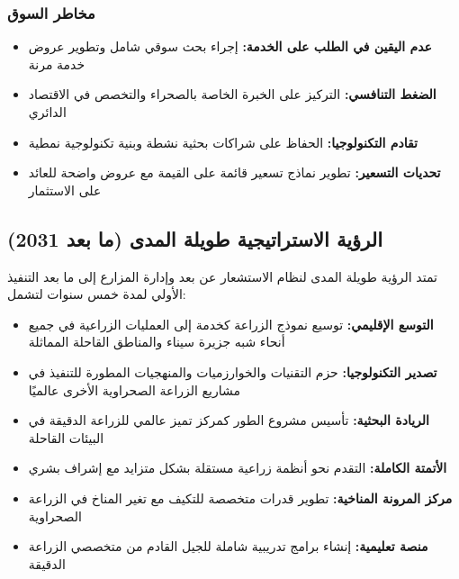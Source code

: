 \subsubsection{مخاطر السوق}
\begin{itemize}
    \item \textbf{عدم اليقين في الطلب على الخدمة:} إجراء بحث سوقي شامل وتطوير عروض خدمة مرنة
    \item \textbf{الضغط التنافسي:} التركيز على الخبرة الخاصة بالصحراء والتخصص في الاقتصاد الدائري
    \item \textbf{تقادم التكنولوجيا:} الحفاظ على شراكات بحثية نشطة وبنية تكنولوجية نمطية
    \item \textbf{تحديات التسعير:} تطوير نماذج تسعير قائمة على القيمة مع عروض واضحة للعائد على الاستثمار
\end{itemize}

\subsection{الرؤية الاستراتيجية طويلة المدى (ما بعد 2031)}

تمتد الرؤية طويلة المدى لنظام الاستشعار عن بعد وإدارة المزارع إلى ما بعد التنفيذ الأولي لمدة خمس سنوات لتشمل:

\begin{itemize}
    \item \textbf{التوسع الإقليمي:} توسيع نموذج الزراعة كخدمة إلى العمليات الزراعية في جميع أنحاء شبه جزيرة سيناء والمناطق القاحلة المماثلة
    
    \item \textbf{تصدير التكنولوجيا:} حزم التقنيات والخوارزميات والمنهجيات المطورة للتنفيذ في مشاريع الزراعة الصحراوية الأخرى عالميًا
    
    \item \textbf{الريادة البحثية:} تأسيس مشروع الطور كمركز تميز عالمي للزراعة الدقيقة في البيئات القاحلة
    
    \item \textbf{الأتمتة الكاملة:} التقدم نحو أنظمة زراعية مستقلة بشكل متزايد مع إشراف بشري
    
    \item \textbf{مركز المرونة المناخية:} تطوير قدرات متخصصة للتكيف مع تغير المناخ في الزراعة الصحراوية
    
    \item \textbf{منصة تعليمية:} إنشاء برامج تدريبية شاملة للجيل القادم من متخصصي الزراعة الدقيقة
\end{itemize} 